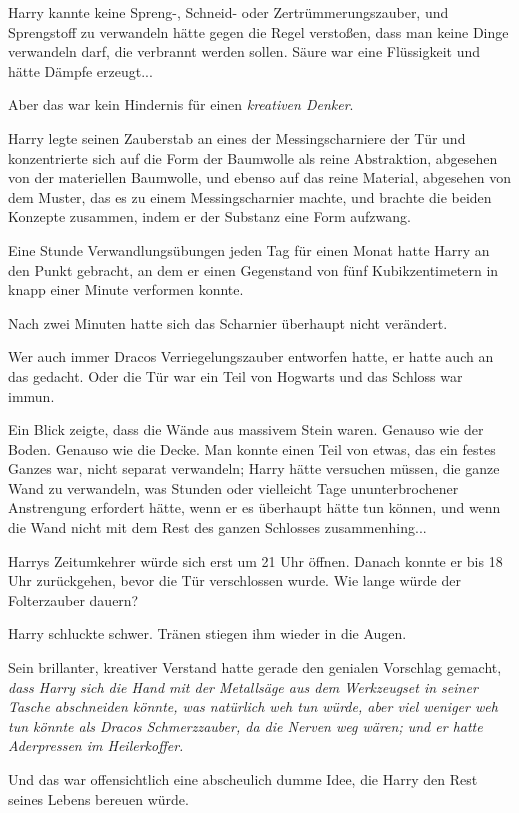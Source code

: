 Harry kannte keine Spreng-, Schneid- oder Zertrümmerungszauber, und Sprengstoff
zu verwandeln hätte gegen die Regel verstoßen, dass man keine Dinge verwandeln
darf, die verbrannt werden sollen. Säure war eine Flüssigkeit und hätte Dämpfe
erzeugt...

Aber das war kein Hindernis für einen \emph{kreativen Denker}.

Harry legte seinen Zauberstab an eines der Messingscharniere der Tür und
konzentrierte sich auf die Form der Baumwolle als reine Abstraktion, abgesehen
von der materiellen Baumwolle, und ebenso auf das reine Material, abgesehen von
dem Muster, das es zu einem Messingscharnier machte, und brachte die beiden
Konzepte zusammen, indem er der Substanz eine Form aufzwang.

Eine Stunde Verwandlungsübungen jeden Tag für einen Monat hatte Harry an den
Punkt gebracht, an dem er einen Gegenstand von fünf Kubikzentimetern in knapp
einer Minute verformen konnte.

Nach zwei Minuten hatte sich das Scharnier überhaupt nicht verändert.

Wer auch immer Dracos Verriegelungszauber entworfen hatte, er hatte auch an das
gedacht. Oder die Tür war ein Teil von Hogwarts und das Schloss war immun.

Ein Blick zeigte, dass die Wände aus massivem Stein waren. Genauso wie der
Boden. Genauso wie die Decke. Man konnte einen Teil von etwas, das ein festes
Ganzes war, nicht separat verwandeln; Harry hätte versuchen müssen, die ganze
Wand zu verwandeln, was Stunden oder vielleicht Tage ununterbrochener
Anstrengung erfordert hätte, wenn er es überhaupt hätte tun können, und wenn die
Wand nicht mit dem Rest des ganzen Schlosses zusammenhing...

Harrys Zeitumkehrer würde sich erst um 21 Uhr öffnen. Danach konnte er bis 18
Uhr zurückgehen, bevor die Tür verschlossen wurde. Wie lange würde der
Folterzauber dauern?

Harry schluckte schwer. Tränen stiegen ihm wieder in die Augen.

Sein brillanter, kreativer Verstand hatte gerade den genialen Vorschlag gemacht,
\emph{dass Harry sich die Hand mit der Metallsäge aus dem Werkzeugset in seiner
Tasche abschneiden könnte, was natürlich weh tun würde, aber viel weniger weh
tun könnte als Dracos Schmerzzauber, da die Nerven weg wären; und er hatte
Aderpressen im Heilerkoffer.}

Und das war offensichtlich eine abscheulich dumme Idee, die Harry den Rest
seines Lebens bereuen würde.

